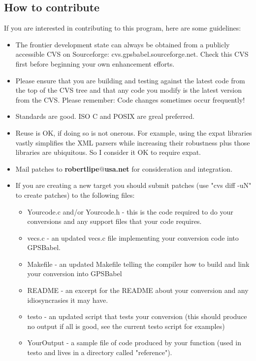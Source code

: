 \documentclass[12pt]{article}
\begin{document}
\begin{appendix}


\section{How to contribute}
\label{HowToContribute}

If you are interested in contributing to this program, here are some 
guidelines:

\begin{itemize}

\item The frontier development state can always be obtained from a publicly accessible CVS on Sourceforge: {\sc cvs.gpsbabel.sourceforge.net}. Check this CVS first before beginning your own enhancement efforts.

\item Please ensure that you are building and testing against the latest code
from the top of the CVS tree and that any code you modify is the latest
version from the CVS. Please remember: Code changes sometimes occur frequently!

\item Standards are good. ISO C and POSIX are greal preferred.

\item Reuse is OK, if doing so is not onerous.  For example, using the {\sc expat}
libraries vastly simplifies the XML parsers while increasing their
robustness plus those libraries are ubiquitous.  So I consider it OK to
require {\sc expat}.

\item Mail patches to {\bfseries robertlipe$@$usa.net} for consideration and
integration.

\item If you are creating a new target you should submit patches (use 
"cvs diff -uN" to create patches) to the following files:
	\begin{itemize}
\item Yourcode.c and/or Yourcode.h - this is the code required to do your
  conversions and any support files that your code requires.
\item vecs.c - an updated vecs.c file implementing your conversion code into
  GPSBabel.
\item Makefile - an updated Makefile telling the compiler how to build and link
  your conversion into GPSBabel
\item README - an excerpt for the README about your conversion and any  
  idiosyncrasies  it may have.
\item testo - an updated script that tests your conversion (this should produce
  no output if all is good, see the current testo script for examples)
\item YourOutput - a sample file of code produced by your function (used in testo
  and lives in a directory called "reference").
	\end{itemize}


\end{itemize}
\end{appendix}
\end{document}
